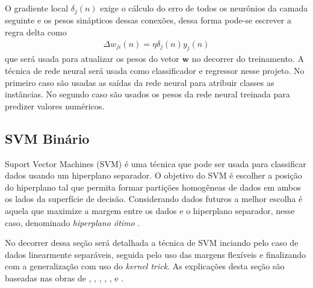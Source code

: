 O gradiente local \(\delta_{j}(n)\) exige o cálculo do erro de todos os neurônios da camada seguinte e os pesos sinápticos dessas conexões, dessa forma pode-se escrever a regra delta como
\begin{align}
\Delta w_{ji}(n) = \eta \delta_{j}(n)y_{j}(n)
\end{align}
que será usada para atualizar os pesos do vetor \(\mathbf{w}\) no decorrer do treinamento. A técnica de rede neural será usada como classificador e regressor nesse projeto. No primeiro caso são usadas as saídas da rede neural para atribuir classes as instâncias. No segundo caso são usados os pesos da rede neural treinada para predizer valores numéricos.

\subsection{SVM Binário}
Suport Vector Machines (SVM) é uma técnica que pode ser usada para classificar dados usando um hiperplano separador. O objetivo do SVM é escolher a posição do hiperplano tal que permita formar partições homogêneas de dados em ambos os lados da superfície de decisão. Considerando dados futuros a melhor escolha é aquela que maximize a margem entre os dados e o hiperplano separador, nesse caso, denominado \emph{hiperplano ótimo} \cite{MachineLearningwithR2013}. 

No decorrer dessa seção será detalhada a técnica de SVM inciando pelo caso de dados linearmente separáveis, seguida pelo uso das margens f\mbox{}lexíveis e finalizando com a generalização com uso do \emph{kernel trick}. As explicações desta seção são baseadas nas obras de , , , , , \cite{Cristianini1999} e .

